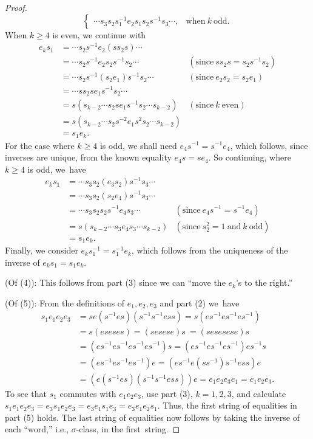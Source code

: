 \documentclass{surv-l}
\numberwithin{equation}{section}
\numberwithin{table}{section}
\numberwithin{figure}{section}
\theoremstyle{plain}
\theoremstyle{definition}
\begin{document}
\begin{proof}
\[\begin{cases}
\cdots s_{3}s_{2}s_{1}^{-1}e_{2}s_{1}s_{2}s^{-1}s_{3}\cdots, &\mathrm{when}\ k\ \mathrm{odd}.
\end{cases}
\]
When $k\geq 4$ is even, we continue with
\[
\begin{array}{lll}
e_{k}s_{1}&=\cdots s_{2}s^{-1}e_{2}(ss_{2}s)\cdots & \\
&=\cdots s_{2}s^{-1}e_{2}s_{2}s^{-1}s_{2}\cdots &(\mathrm{since}\ ss_2s =s_{2}s^{-1}s_{2}) \\
&=\cdots s_{2}s^{-1}(s_{2}e_{1})s^{-1}s_{2}\cdots &(\mathrm{since}\
e_{2}s_{2}=s_{2}e_{1}) \\
&=\cdots ss_{2}se_{1}s^{-1}s_{2}\cdots \\
&=s(s_{k-2}\cdots s_{2}se_{1}s^{-1}s_{2}\cdots s_{k-2}) &(\mathrm{since}\
k\ \mathrm{even}) \\
&=s(s_{k-2}\cdots s_{2}s^{-2}e_{1}s^{2}s_{2}\cdots s_{k-2}) \\
&=s_{1}e_{k}.
\end{array}
\]
For the case where $k\geq 4$ is odd, we shall need
$e_{4}s^{-1}=s^{-1}e_{4}$, which follows, since inverses are
unique, from the known equality $e_{4}s=se_{4}$. So
continuing, where $k\geq 4$ is odd, we~have
\[
\begin{array}{lll}
e_{k}s_{1}&=\cdots s_{3}s_{2}(e_{3}s_{2})s^{-1}s_{3}\cdots & \\
&=\cdots s_{3}s_{2}(s_{2}e_{4})s^{-1}s_{3}\cdots & \\
&=\cdots s_{3}s_{2}s_{2}s^{-1}e_{4}s_{3}\cdots &(\mathrm{since}\ e_{4}s^{-1}=s^{-1}e_{4}) \\
&=s(s_{k-2}\cdots s_3e_{4}s_{3}\cdots s_{k-2}) &(\mathrm{since}\ s_{2}^{2}=1\ \mathrm{and}\ k\ \mathrm{odd}) \\
&=s_{1}e_{k}. &
\end{array}
\]
Finally, we consider $e_{k}s_{1}^{-1}=s_{1}^{-1}e_{k}$, which
follows from the uniqueness of the inverse of
$e_{k}s_{1}=s_{1}e_{k}$.

\noindent (Of (4)): This follows from part (3) since we can ``move the
$e_{k}$'s to the right.''

\noindent (Of (5)): From the definitions of $e_{1}, e_{2}, e_{3}$ and part (2) we~have
\begin{align*}
s_{1}e_{1}e_{2}e_{3}&=se(s^{-1}es)(s^{-1}s^{-1}ess)=s(es^{-1}es^{-1}es^{-1}) \\
&=s(eseses)=(sesese)s\ =(sesesese)s \\
&=(es^{-1}es^{-1}es^{-1}es^{-1})s=(es^{-1}es^{-1}es^{-1})es^{-1}s \\
&=(es^{-1}es^{-1}es^{-1})e=(es^{-1}e(ss^{-1})s^{-1}ess)e \\
&=(e(s^{-1}es)(s^{-1}s^{-1}ess))e=e_{1}e_{2}e_{3}e_{1}=e_{1}e_{2}e_{3}.
\end{align*}
To see that $s_1$ commutes with $e_{1}e_{2}e_{3}$, use part
(3), $k=1,2,3$, and calculate
$s_{1}e_{1}e_{2}e_{3}=e_{3}s_{1}e_{2}e_{3}=e_{3}e_{1}s_{1}e_{3}=e_{3}e_{1}e_{2}s_{1}$.
Thus, the first string of equalities in part (5) holds. The
last string of equalities now follows by taking the inverse of
each ``word,'' i.e., $\sigma$-class, in the first~string.
\end{proof}
\end{document}
